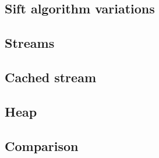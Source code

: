 
\subsection{Sift algorithm variations}

\subsection{Streams}


\subsection{Cached stream}

\subsection{Heap}


\subsection{Comparison}